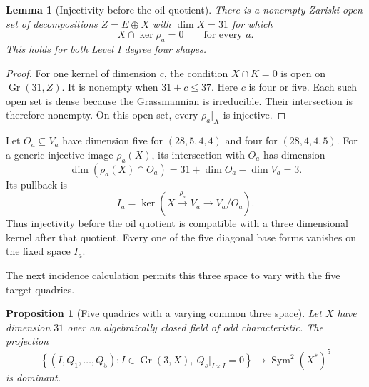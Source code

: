 \documentclass[11pt]{article}
\newcommand{\Sym}{\operatorname{Sym}}
\newcommand{\Gr}{\operatorname{Gr}}
\theoremstyle{plain}
\newtheorem{proposition}[theorem]{Proposition}
\newtheorem{lemma}[theorem]{Lemma}
\theoremstyle{definition}
\theoremstyle{remark}
\begin{document}
\begin{lemma}[Injectivity before the oil quotient]
\label{lem:l4-main-injective}
There is a nonempty Zariski open set of decompositions $Z=E\oplus X$ with
$\dim X=31$ for which
\[
  X\cap\ker\rho_a=0
  \qquad\text{for every }a.
\]
This holds for both Level I degree four shapes.
\end{lemma}

\begin{proof}
For one kernel of dimension $c$, the condition $X\cap K=0$ is open on
$\Gr(31,Z)$.  It is nonempty when $31+c\leq37$.  Here $c$ is four or five.
Each such open set is dense because the Grassmannian is irreducible.  Their
intersection is therefore nonempty.  On this open set, every
$\rho_a|_X$ is injective.
\end{proof}

Let $O_a\subseteq V_a$ have dimension five for $(28,5,4,4)$ and four for
$(28,4,4,5)$.  For a generic injective image $\rho_a(X)$, its intersection
with $O_a$ has dimension
\[
 \dim(\rho_a(X)\cap O_a)=31+\dim O_a-\dim V_a=3.
\]
Its pullback is
\[
 I_a=\ker(X\xrightarrow{\rho_a}V_a\to V_a/O_a).
\]
Thus injectivity before the oil quotient is compatible with a three
dimensional kernel after that quotient.  Every one of the five diagonal base
forms vanishes on the fixed space $I_a$.

The next incidence calculation permits this three space to vary with the
five target quadrics.

\begin{proposition}[Five quadrics with a varying common three space]
\label{prop:l4-incidence}
Let $X$ have dimension $31$ over an algebraically closed field of odd
characteristic.  The projection
\[
 \left\{(I,Q_1,\ldots,Q_5):
 I\in\Gr(3,X),\ Q_s|_{I\times I}=0\right\}
 \longrightarrow \Sym^2(X^*)^5
\]
is dominant.
\end{proposition}
\end{document}
